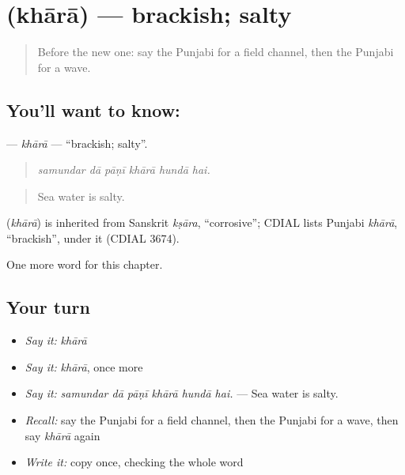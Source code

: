 \section[\texorpdfstring{\pa{ਖਾਰਾ} (khārā)}{ਖਾਰਾ (khārā)}]{ (khārā) — brackish; salty}

\label{lesson:PA-C299-khara}



\begin{quote}
Before the new one: say the Punjabi for a field channel, then the Punjabi for a wave.
\end{quote}

\subsection*{You'll want to know: }
\textbf{} — \emph{khārā} — \textquotedblleft{}brackish; salty\textquotedblright{}.

\begin{quote}
     
\end{quote}

\begin{quote}
\emph{samundar dā pāṇī khārā hundā hai.}
\end{quote}

\begin{quote}
Sea water is salty.
\end{quote}

\begin{cousinweb}
\textbf{} (\emph{khārā}) is inherited from Sanskrit \emph{kṣāra}, \textquotedblleft{}corrosive\textquotedblright{}; CDIAL lists Punjabi \emph{khārā}, \textquotedblleft{}brackish\textquotedblright{}, under it (CDIAL 3674).
\end{cousinweb}

\begin{grammarlens}[title={What you've built}]
One more word for this chapter.
\end{grammarlens}

\subsection*{Your turn}
\begin{itemize}
\raggedright
  \item \emph{Say it:} \emph{khārā}
  \item \emph{Say it:} \emph{khārā}, once more
  \item \emph{Say it:} \emph{samundar dā pāṇī khārā hundā hai.} — Sea water is salty.
  \item \emph{Recall:} say the Punjabi for a field channel, then the Punjabi for a wave, then say \emph{khārā} again
  \item \emph{Write it:} copy \textbf{} once, checking the whole word
\end{itemize}

